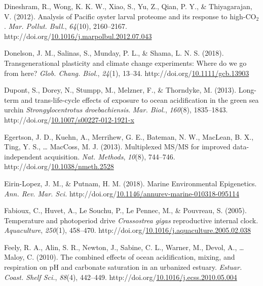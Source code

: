 \documentclass [11pt, proquest] {uwthesis}[2015/03/03]
\newlength{\cslhangindent}
\newenvironment{CSLReferences}%
{\setlength{\parindent}{0pt}%
\everypar{\setlength{\hangindent}{\cslhangindent}}\ignorespaces}%
{\par}
\begin{document}
\begin{CSLReferences}{1}{0}
\leavevmode\hypertarget{ref-Dineshram2012}{}%
Dineshram, R., Wong, K. K. W., Xiao, S., Yu, Z., Qian, P. Y., \& Thiyagarajan, V. (2012). {Analysis of Pacific oyster larval proteome and its response to high-{CO\(_2\)}}. \emph{Mar. Pollut. Bull.}, \emph{64}(10), 2160--2167. http://doi.org/\href{https://doi.org/10.1016/j.marpolbul.2012.07.043}{10.1016/j.marpolbul.2012.07.043}

\leavevmode\hypertarget{ref-Donelson2018}{}%
Donelson, J. M., Salinas, S., Munday, P. L., \& Shama, L. N. S. (2018). {Transgenerational plasticity and climate change experiments: Where do we go from here?} \emph{Glob. Chang. Biol.}, \emph{24}(1), 13--34. http://doi.org/\href{https://doi.org/10.1111/gcb.13903}{10.1111/gcb.13903}

\leavevmode\hypertarget{ref-Dupont2013}{}%
Dupont, S., Dorey, N., Stumpp, M., Melzner, F., \& Thorndyke, M. (2013). {Long-term and trans-life-cycle effects of exposure to ocean acidification in the green sea urchin \emph{Strongylocentrotus droebachiensis}}. \emph{Mar. Biol.}, \emph{160}(8), 1835--1843. http://doi.org/\href{https://doi.org/10.1007/s00227-012-1921-x}{10.1007/s00227-012-1921-x}

\leavevmode\hypertarget{ref-Egertson2013}{}%
Egertson, J. D., Kuehn, A., Merrihew, G. E., Bateman, N. W., MacLean, B. X., Ting, Y. S., \ldots{} MacCoss, M. J. (2013). {Multiplexed MS/MS for improved data-independent acquisition}. \emph{Nat. Methods}, \emph{10}(8), 744--746. http://doi.org/\href{https://doi.org/10.1038/nmeth.2528}{10.1038/nmeth.2528}

\leavevmode\hypertarget{ref-Eirin-Lopez2018}{}%
Eirin-Lopez, J. M., \& Putnam, H. M. (2018). {Marine Environmental Epigenetics}. \emph{Ann. Rev. Mar. Sci.} http://doi.org/\href{https://doi.org/10.1146/annurev-marine-010318-095114}{10.1146/annurev-marine-010318-095114}

\leavevmode\hypertarget{ref-Fabioux2005}{}%
Fabioux, C., Huvet, A., Le Souchu, P., Le Pennec, M., \& Pouvreau, S. (2005). {Temperature and photoperiod drive \emph{Crassostrea gigas} reproductive internal clock}. \emph{Aquaculture}, \emph{250}(1), 458--470. http://doi.org/\href{https://doi.org/10.1016/j.aquaculture.2005.02.038}{10.1016/j.aquaculture.2005.02.038}

\leavevmode\hypertarget{ref-Feely2010}{}%
Feely, R. A., Alin, S. R., Newton, J., Sabine, C. L., Warner, M., Devol, A., \ldots{} Maloy, C. (2010). {The combined effects of ocean acidification, mixing, and respiration on pH and carbonate saturation in an urbanized estuary}. \emph{Estuar. Coast. Shelf Sci.}, \emph{88}(4), 442--449. http://doi.org/\href{https://doi.org/10.1016/j.ecss.2010.05.004}{10.1016/j.ecss.2010.05.004}


\end{CSLReferences}
\end{document}
